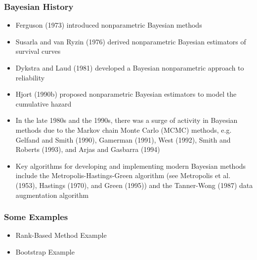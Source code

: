 \documentclass[10pt]{beamer}
\begin{document}
\begin{frame}
\frametitle{Bayesian History}

\begin{itemize}
\item Ferguson (1973) introduced nonparametric Bayesian methods
\item Susarla and van Ryzin (1976) derived nonparametric Bayesian estimators of survival curves
\item Dykstra and Laud (1981) developed a Bayesian nonparametric approach to reliability
\item Hjort (1990b) proposed nonparametric Bayesian estimators to model the cumulative hazard
\item In the late 1980s and the 1990s, there was a surge of activity in Bayesian methods due to the Markov chain Monte Carlo (MCMC) methods, e.g. Gelfand and Smith (1990), Gamerman (1991), West (1992), Smith and Roberts (1993), and Arjas and Gasbarra (1994)
\item Key algorithms for developing and implementing modern Bayesian methods include the Metropolis-Hastings-Green algorithm (see Metropolis et al. (1953), Hastings (1970), and Green (1995)) and the Tanner-Wong (1987) data augmentation algorithm
\end{itemize}

\end{frame}

\begin{frame}
\frametitle{Some Examples}

\begin{itemize}
\item Rank-Based Method Example
\item Bootstrap Example
\end{itemize}

\end{frame}
\end{document}
